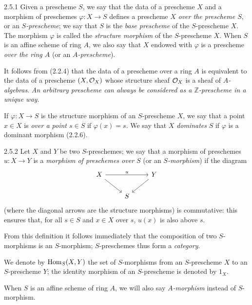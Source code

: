 \documentclass[../main.tex]{subfiles}
\begin{document}
\begin{env}[Definition]{2.5.1}
    Given a prescheme $S$, we say that the data of a prescheme $X$ and a morphism of preschemes $\varphi\colon X\to S$ defines a prescheme $X$ \emph{over the prescheme $S$}, or an \emph{$S$-prescheme}; we say that $S$ is the \emph{base prescheme} of the $S$-prescheme $X$.
    The morphism $\varphi$ is called the \emph{structure morphism} of the $S$-prescheme $X$.
    When $S$ is an affine scheme of ring $A$, we also say that $X$ endowed with $\varphi$ is a prescheme \emph{over the ring $A$} (or an \emph{$A$-prescheme}).
\end{env}

It follows from (2.2.4) that the data of a prescheme over a ring $A$ is equivalent to the data of a prescheme $(X,\mathcal{O}_X)$ whose structure sheaf $\mathcal{O}_X$ is a sheaf of \emph{$A$-algebras}.
\emph{An arbitrary prescheme can always be considered as a $\mathbb{Z}$-prescheme in a unique way.}

If $\varphi\colon X\to S$ is the structure morphism of an $S$-prescheme $X$, we say that a point $x\in X$ is \emph{over a point $s\in S$} if $\varphi(x)=s$.
We say that $X$ \emph{dominates} $S$ if $\varphi$ is a dominant morphism (2.2.6).

\begin{env}{2.5.2}
    Let $X$ and $Y$ be two $S$-preschemes; we say that a morphism of preschemes $u\colon X\to Y$ is a \emph{morphism of preschemes over $S$} (or an \emph{$S$-morphism}) if the diagram
    \begin{equation*}
        \begin{tikzcd}
            X \arrow[rr,"u"] \arrow[dr] & & Y \arrow[dl]\\
            & S &
        \end{tikzcd}
    \end{equation*}
    (where the diagonal arrows are the structure morphisms) is commutative: this ensures that, for all $s\in S$ and $x\in X$ over $s$, $u(x)$ is also above $s$.
\end{env}

From this definition it follows immediately that the composition of two $S$-morphisms is an $S$-morphism; $S$-preschemes thus form a \emph{category}.

We denote by $\operatorname{Hom}_S(X,Y)$ the set of $S$-morphisms from an $S$-prescheme $X$ to an $S$-prescheme $Y$; the identity morphism of an $S$-prescheme is denoted by $1_X$.

When $S$ is an affine scheme of ring $A$, we will also say \emph{$A$-morphism} instead of $S$-morphism.
\end{document}
